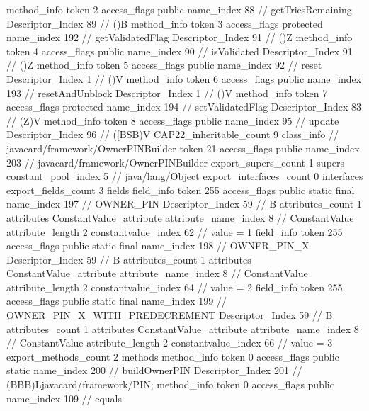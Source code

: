 {{{{{				}
				method_info {
					token	2
					access_flags	public
					name_index	88		// getTriesRemaining
					Descriptor_Index	89		// ()B
				}
				method_info {
					token	3
					access_flags	protected
					name_index	192		// getValidatedFlag
					Descriptor_Index	91		// ()Z
				}
				method_info {
					token	4
					access_flags	public
					name_index	90		// isValidated
					Descriptor_Index	91		// ()Z
				}
				method_info {
					token	5
					access_flags	public
					name_index	92		// reset
					Descriptor_Index	1		// ()V
				}
				method_info {
					token	6
					access_flags	public
					name_index	193		// resetAndUnblock
					Descriptor_Index	1		// ()V
				}
				method_info {
					token	7
					access_flags	protected
					name_index	194		// setValidatedFlag
					Descriptor_Index	83		// (Z)V
				}
				method_info {
					token	8
					access_flags	public
					name_index	95		// update
					Descriptor_Index	96		// ([BSB)V
				}
			}
			CAP22_inheritable_count	9
		}
		class_info {		// javacard/framework/OwnerPINBuilder
			token	21
			access_flags	public
			name_index	203		// javacard/framework/OwnerPINBuilder
			export_supers_count	1
			supers {
				constant_pool_index	5		// java/lang/Object
			}
			export_interfaces_count	0
			interfaces {
			}
			export_fields_count	3
			fields {
			field_info {
				token	255
				access_flags	public static final
				name_index	197		// OWNER_PIN
				Descriptor_Index	59		// B
				attributes_count	1
				attributes {
				ConstantValue_attribute {
					attribute_name_index	8		// ConstantValue
					attribute_length	2
					constantvalue_index	62		// value = 1
				}
				}
			}
			field_info {
				token	255
				access_flags	public static final
				name_index	198		// OWNER_PIN_X
				Descriptor_Index	59		// B
				attributes_count	1
				attributes {
				ConstantValue_attribute {
					attribute_name_index	8		// ConstantValue
					attribute_length	2
					constantvalue_index	64		// value = 2
				}
				}
			}
			field_info {
				token	255
				access_flags	public static final
				name_index	199		// OWNER_PIN_X_WITH_PREDECREMENT
				Descriptor_Index	59		// B
				attributes_count	1
				attributes {
				ConstantValue_attribute {
					attribute_name_index	8		// ConstantValue
					attribute_length	2
					constantvalue_index	66		// value = 3
				}
				}
			}
			}
			export_methods_count	2
			methods {
				method_info {
					token	0
					access_flags	public static
					name_index	200		// buildOwnerPIN
					Descriptor_Index	201		// (BBB)Ljavacard/framework/PIN;
				}
				method_info {
					token	0
					access_flags	public
					name_index	109		// equals
}}}}}
